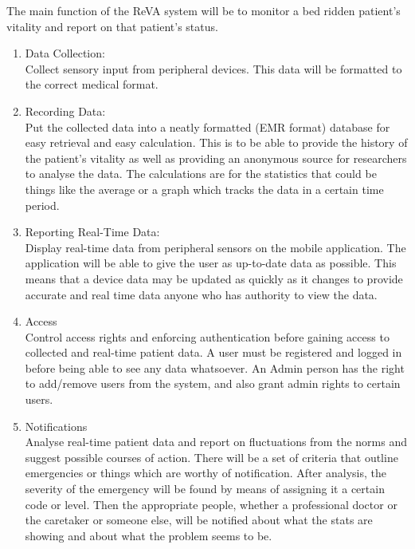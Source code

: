 The main function of the ReVA system will be to monitor a bed ridden patient's vitality and report on that patient's status.
\begin{enumerate}

\item Data Collection: \\
Collect sensory input from peripheral devices. This data will be formatted to the correct medical format. 

\item Recording Data:\\
Put the collected data into a neatly formatted (EMR format) database for easy retrieval and easy calculation. This is to be able to provide the history of the patient's vitality as well as providing an anonymous source for researchers to analyse the data. The calculations are for the statistics that could be things like the average or a graph which tracks the data in a certain time period.

\item Reporting Real-Time Data:\\
Display real-time data from peripheral sensors on the mobile application. The application will be able to give the user as up-to-date data as possible. This means that a device data may be updated as quickly as it changes to provide accurate and real time data anyone who has authority to view the data.

\item Access\\
Control access rights and enforcing authentication before gaining access to collected and real-time patient data. A user must be registered and logged in before being able to see any data whatsoever. An Admin person has the right to add/remove users from the system, and also grant admin rights to certain users.
 
\item Notifications\\
Analyse real-time patient data and report on fluctuations from the norms and suggest possible courses of action. There will be a set of criteria that outline emergencies or things which are worthy of notification. After analysis, the severity of the emergency will be found by means of assigning it a certain code or level. Then the appropriate people, whether a professional doctor or the caretaker or someone else, will be notified about what the stats are showing and about what the problem seems to be.
\end{enumerate}